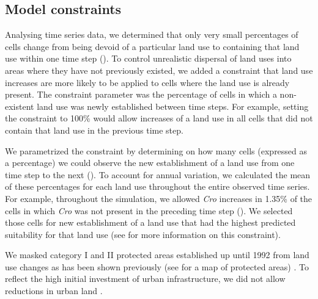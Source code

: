 \documentclass[titlesmallcaps,copyrightpage]{uomthesis}\usepackage[]{graphicx}\usepackage[]{color}
\begin{document}
\subsection{Model constraints}

Analysing time series data, we determined that only very small
percentages of cells change from being devoid of a particular land use
to containing that land use within one time step (). To control unrealistic dispersal of land uses into
areas where they have not previously existed, we added a constraint that
land use increases are more likely to be applied to cells where the land
use is already present. The constraint parameter was the percentage of
cells in which a non-existent land use was newly established between
time steps. For example, setting the constraint to 100\% would allow
increases of a land use in all cells that did not contain that land use
in the previous time step.

We parametrized the constraint by determining on how many cells
(expressed as a percentage) we could observe the new establishment of a
land use from one time step to the next (). To
account for annual variation, we calculated the mean of these
percentages for each land use throughout the entire observed time
series. For example, throughout the simulation, we allowed \emph{Cro}
increases in 1.35\% of the cells in which \emph{Cro} was not present in
the preceding time step (). We selected those
cells for new establishment of a land use that had the highest predicted
suitability for that land use (see  for more information on
this constraint).

We masked category I and II protected areas established up until 1992
from land use changes as has been shown previously (see
 for a map of protected areas)
\citep{verburg_modeling_2002, iucn_world_2014, kapitza_assessing_2021}.
To reflect the high initial investment of urban infrastructure, we did
not allow reductions in urban land \citep{verburg_combining_2009}.
\end{document}
